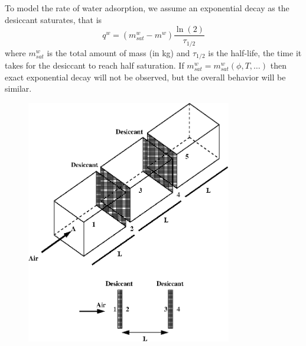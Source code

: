 \documentclass[11pt]{article}
\begin{document}
To model the rate of water adsorption, we assume an exponential decay as the desiccant saturates, that is
\[
q^w = (m^w_{sat}-m^w)\frac{\ln(2)}{\tau_{1/2}}
\]
where $m^w_{sat}$ is the total amount of mass (in kg) and $\tau_{1/2}$ is the half-life, the time it takes for the desiccant to reach half saturation. If $m^w_{sat} = m^w_{sat}(\phi,T,\ldots)$ then exact exponential decay will not be observed, but the overall behavior will be similar.
\newpage
\begin{figure}[!ht]
\centering
\includegraphics[width=0.8\textwidth]{images/drips.png}
\end{figure}
\end{document}

